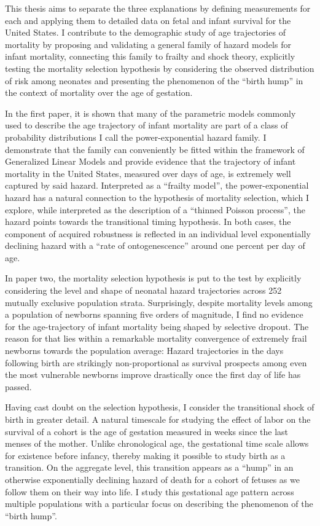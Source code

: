 \documentclass[
  10pt, twoside
]{book}
\begin{document}
This thesis aims to separate the three explanations by defining measurements for each and applying them to detailed data on fetal and infant survival for the United States. I contribute to the demographic study of age trajectories of mortality by proposing and validating a general family of hazard models for infant mortality, connecting this family to frailty and shock theory, explicitly testing the mortality selection hypothesis by considering the observed distribution of risk among neonates and presenting the phenomenon of the ``birth hump'' in the context of mortality over the age of gestation.

In the first paper, it is shown that many of the parametric models commonly used to describe the age trajectory of infant mortality are part of a class of probability distributions I call the power-exponential hazard family. I demonstrate that the family can conveniently be fitted within the framework of Generalized Linear Models and provide evidence that the trajectory of infant mortality in the United States, measured over days of age, is extremely well captured by said hazard. Interpreted as a ``frailty model'', the power-exponential hazard has a natural connection to the hypothesis of mortality selection, which I explore, while interpreted as the description of a ``thinned Poisson process'', the hazard points towards the transitional timing hypothesis. In both cases, the component of acquired robustness is reflected in an individual level exponentially declining hazard with a ``rate of ontogenescence'' around one percent per day of age.

In paper two, the mortality selection hypothesis is put to the test by explicitly considering the level and shape of neonatal hazard trajectories across 252 mutually exclusive population strata. Surprisingly, despite mortality levels among a population of newborns spanning five orders of magnitude, I find no evidence for the age-trajectory of infant mortality being shaped by selective dropout. The reason for that lies within a remarkable mortality convergence of extremely frail newborns towards the population average: Hazard trajectories in the days following birth are strikingly non-proportional as survival prospects among even the most vulnerable newborns improve drastically once the first day of life has passed.

Having cast doubt on the selection hypothesis, I consider the transitional shock of birth in greater detail. A natural timescale for studying the effect of labor on the survival of a cohort is the age of gestation measured in weeks since the last menses of the mother. Unlike chronological age, the gestational time scale allows for existence before infancy, thereby making it possible to study birth as a transition. On the aggregate level, this transition appears as a ``hump'' in an otherwise exponentially declining hazard of death for a cohort of fetuses as we follow them on their way into life. I study this gestational age pattern across multiple populations with a particular focus on describing the phenomenon of the ``birth hump''.
\end{document}
